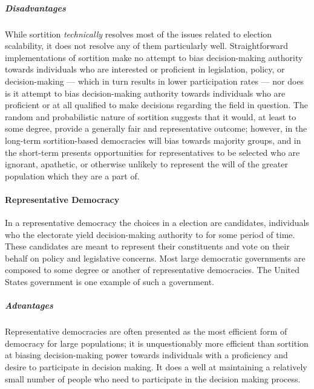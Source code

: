 \subparagraph{Disadvantages} While sortition \emph{technically} resolves most of
the issues related to election scalability, it does not resolve any of them
particularly well. Straightforward implementations of sortition make no attempt
to bias decision-making authority towards individuals who are interested or
proficient in legislation, policy, or decision-making --- which in turn results
in lower participation rates --- nor does is it attempt to bias decision-making
authority towards individuals who are proficient or at all qualified to make
decisions regarding the field in question. The random and probabilistic nature
of sortition suggests that it would, at least to some degree, provide a
generally fair and representative outcome; however, in the long-term
sortition-based democracies will bias towards majority groups, and in the
short-term presents opportunities for representatives to be selected who are
ignorant, apathetic, or otherwise unlikely to represent the will of the greater
population which they are a part of.

%



\paragraph{Representative Democracy}
In a representative democracy the choices in a election are candidates,
individuals who the electorate yield decision-making authority to for some
period of time. These candidates are meant to represent their constituents and
vote on their behalf on policy and legislative concerns. Most large democratic
governments are composed to some degree or another of representative
democracies. The United States government is one example of such a government.

\subparagraph{Advantages} Representative democracies are often presented as the
most efficient form of democracy for large populations; it is unquestionably
more efficient than sortition at biasing decision-making power towards
individuals with a proficiency and desire to participate in decision making. It
does a well at maintaining a relatively small number of people who need to
participate in the decision making process.

